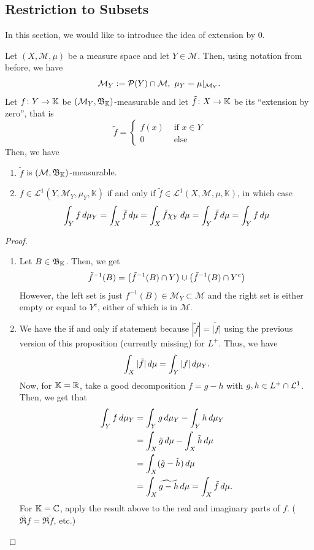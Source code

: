 \documentclass[11pt,leqno,oneside]{amsbook}
\numberwithin{thm}{section}
\renewcommand{\P}{\mathcal{P}} %
\newcommand{\M}{\mathcal{M}} %
\newcommand{\cL}{\mathcal{L}}
\newcommand{\K}{\mathbb{K}} %
\begin{document}
\subsection{Restriction to Subsets}
In this section, we would like to introduce the idea of extension by
0.
\begin{prop}
  Let \((X,\M,\mu)\) be a measure space and let \(Y \in \M\). Then,
  using notation from before, we have \[
    \M_Y := \P(Y) \intersect \M, \ \mu_Y = \mu|_{\M_Y}.
  \]
  Let \(f \from Y \to \K\) be \((\M_Y,\B_\K)\)-measurable and let
  \(\tilde{f} \from X \to \K\) be its ``extension by zero'', that
  is \[
    \tilde{f} =
    \begin{cases}
      f(x) & \text{ if }x \in Y \\
      0 & \text{ else }
    \end{cases}
  \]
  Then, we have
  \begin{enumerate}
  \item \(\tilde{f}\) is \((\M,\B_\K)\)-measurable.
  \item \(f \in \cL^1(Y,\M_Y,\mu_Y,\K)\) if and only if \(\tilde{f}
    \in \cL^1(X,\M,\mu,\K)\), in which case \[
      \int_Y f \, d\mu_Y = \int_X \tilde{f} \, d\mu = \int_X \tilde{f}
      \chi_Y \, d\mu = \int_Y \tilde{f} \, d\mu = \int_Y f \, d\mu
    \]
  \end{enumerate}
\end{prop}
\begin{proof}
  \begin{enumerate}
  \item Let \(B \in \B_\K\). Then, we get \[
      \tilde{f}^{-1}(B) = \left( \tilde{f}^{-1}(B) \cap Y
      \right) \cup \left( \tilde{f}^{-1}(B) \cap Y^c \right)
    \]
    However, the left set is just \(f^{-1}(B) \in \M_Y \subset \M\)
    and the right set is either empty or equal to \(Y^c\), either of
    which is in \(\M\).
  \item We have the if and only if statement because \(|\tilde{f}| =
    \widetilde{|f|}\) using the previous version of this proposition
    (currently missing) for \(L^+\). Thus, we have \[
      \int_X |\tilde{f}| \, d\mu = \int_Y |f| \, d\mu_Y.
    \]
    Now, for \(\K=\R\), take a good decomposition \(f = g-h\) with
    \(g,h \in L^+ \intersect \cL^1\). Then, we get that
    \begin{align*}
      \int_Y f \, d\mu_Y & = \int_Y g \, d\mu_Y - \int_Y h \, d\mu_Y \\
                      & = \int_X \tilde{g} \, d\mu - \int_X \tilde{h} \, d\mu \\
                      & = \int_X (\tilde{g} - \tilde{h}) \, d\mu \\
      & = \int_X \widetilde{g-h} \, d\mu = \int_X \tilde{f} \, d\mu.
    \end{align*}
    For \(\K = \C\), apply the result above to the real and imaginary
    parts of \(f\). (\(\widetilde{\Re f} = \Re \tilde{f}\), etc.)
  \end{enumerate}
\end{proof}
\end{document}
